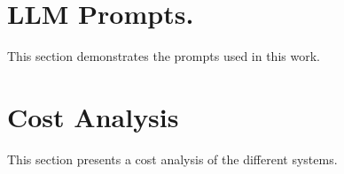 \cleardoublepage
\chapter{LLM Prompts.}
\label{ch:appendices}

This section demonstrates the prompts used in this work.

\chapter{Cost Analysis}

This section presents a cost analysis of the different systems.
